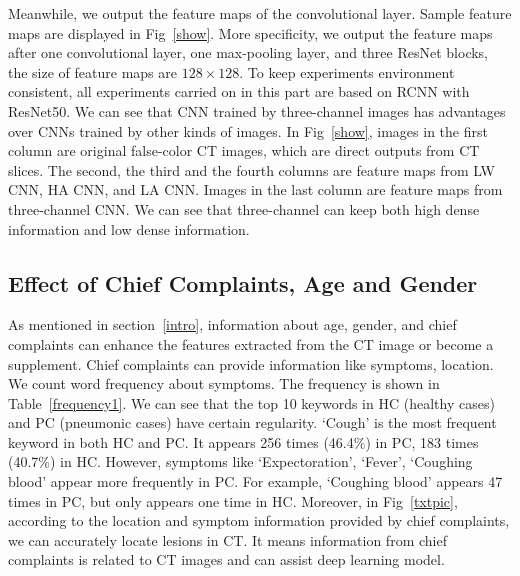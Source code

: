 \documentclass[journal]{IEEEtran}
\begin{document}
Meanwhile, we output the feature maps of the convolutional layer. Sample feature maps are displayed in Fig~\ref{show}. More specificity, we output the feature maps after one convolutional layer, one max-pooling layer, and three ResNet blocks, the size of feature maps are $128 \times 128$. To keep experiments environment consistent, all experiments carried on in this part are based on RCNN with ResNet50. We can see that CNN trained by three-channel images has advantages over CNNs trained by other kinds of images. 
In Fig~\ref{show}, images in the first column are original false-color CT images, which are direct outputs from CT slices. The second, the third and the fourth columns are feature maps from LW CNN, HA CNN, and LA CNN. Images in the last column are feature maps from three-channel CNN. We can see that three-channel can keep both high dense information and low dense information. 

\subsection{Effect of Chief Complaints, Age and Gender}
\label{complaintsagegender}
As mentioned in section~\ref{intro}, information about age, gender, and chief complaints can enhance the features extracted from the CT image or become a supplement. Chief complaints can provide information like symptoms, location.
We count word frequency about symptoms. The frequency is shown in Table~\ref{frequency1}. We can see that the top 10 keywords in HC (healthy cases) and PC (pneumonic cases) have certain regularity. `Cough' is the most frequent keyword in both HC and PC. It appears 256 times (46.4\%) in PC, 183 times (40.7\%) in HC. However, symptoms like `Expectoration', `Fever', `Coughing blood' appear more frequently in PC. For example, `Coughing blood' appears 47 times in PC, but only appears one time in HC. 
Moreover, in Fig~\ref{txtpic}, according to the location and symptom information provided by chief complaints, we can accurately locate lesions in CT. It means information from chief complaints is related to CT images and can assist deep learning model.
\end{document}
